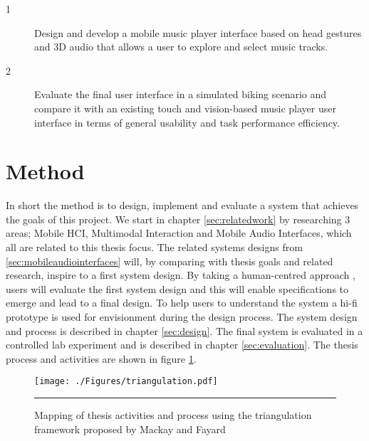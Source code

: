 

\begin{description}
\item[1] Design and develop a mobile music player interface based on head gestures and 3D audio that allows a user to explore and select music tracks.
\item[2] Evaluate the final user interface in a simulated biking scenario and compare it with an existing touch and vision-based music player user interface in terms of general usability and task performance efficiency.
\end{description}


\section{Method}
In short the method is to design, implement and evaluate a system that achieves the goals of this project. We start in chapter \ref{sec:relatedwork} by researching 3 areas; Mobile HCI, Multimodal Interaction and Mobile Audio Interfaces, which all are related to this thesis focus. The related systems designs from \ref{sec:mobileaudiointerfaces} will, by comparing with thesis goals and related research, inspire to a first system design. By taking a human-centred approach \cite{benyon_designing_2010}, users will evaluate the first system design and this will enable specifications to emerge and lead to a final design. To help users to understand the system a hi-fi prototype is used for envisionment \cite{benyon_designing_2010} during the design process. The system design and process is described in chapter \ref{sec:design}. The final system is evaluated in a controlled lab experiment and is described in chapter \ref{sec:evaluation}. The thesis process and activities are shown in figure \ref{fig:triangulation}.

\begin{figure}[htbp]
	\centering
		\texttt{[image: ./Figures/triangulation.pdf]}
		\rule{35em}{0.5pt}
	\caption[Triangulation]{Mapping of thesis activities and process using the triangulation framework proposed by Mackay and Fayard \cite{mackay_hci_1997}}
	\label{fig:triangulation}
\end{figure}








